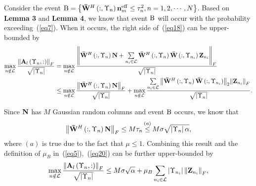 \documentclass[a4paper,12pt]{article}
\begin{document}
{\begin{framed}
{Consider the event ${{\rm{B}} = \left\{ {{{{\bf{\bar W}}}^H}\left( {:,{\Upsilon _n}} \right){\bf{n}}_m^{{\rm{eff}}} \le \tau _n^2,n = 1,2, \cdots ,N} \right\}}$. Based on \textbf{Lemma 3} and \textbf{Lemma 4}, we know that event ${{\rm{B}}}$ will occur with the probability exceeding~(\ref{eq7}). When it occurs, the right side of~(\ref{eq18}) can be upper-bounded by
\begin{align}\label{eq19}
\mathop {\max }\limits_{n \notin {\cal L}} \frac{{{{\left\| {{{\bf{A}}_l}\left( {{\Upsilon _n},:} \right)} \right\|}_F}}}{{\sqrt {\left| {{\Upsilon _n}} \right|} }} & = \mathop {\max }\limits_{n \notin {\cal L}} \frac{{{{\left\| {{{{\bf{\bar W}}}^H}\left( {:,{\Upsilon _n}} \right){\bf{N}} + \sum\limits_{{n_i} \in {\cal L}} {{{{\bf{\bar W}}}^H}\left( {:,{\Upsilon _n}} \right){\bf{\bar W}}\left( {:,{\Upsilon _{{n_i}}}} \right){{\bf{Z}}_{{n_i}}}} } \right\|}_F}}}{{\sqrt {\left| {{\Upsilon _n}} \right|} }}\\ \nonumber
& \le \mathop {\max }\limits_{n \notin {\cal L}} \frac{{{{\left\| {{{{\bf{\bar W}}}^H}\left( {:,{\Upsilon _n}} \right){\bf{N}}} \right\|}_F}}}{{\sqrt {\left| {{\Upsilon _n}} \right|} }} + \mathop {\max }\limits_{n \notin {\cal L}} \frac{{\sum\limits_{{n_i} \in {\cal L}} {{{\left\| {{{{\bf{\bar W}}}^H}\left( {:,{\Upsilon _n}} \right){\bf{\bar W}}\left( {:,{\Upsilon _{{n_i}}}} \right)} \right\|}_2}{{\left\| {{{\bf{Z}}_{{n_i}}}} \right\|}_F}} }}{{\sqrt {\left| {{\Upsilon _n}} \right|} }}.
\end{align}

Since ${{\bf{N}}}$ has ${M}$ Gaussian random columns and event ${{\rm{B}}}$ occurs, we know that
\begin{equation}\label{eq20}
{\left\| {{{{\bf{\bar W}}}^H}\left( {:,{\Upsilon _n}} \right){\bf{N}}} \right\|_F} \le M{\tau _n}\mathop  \le \limits^{\left( a \right)} M\sigma \sqrt {\left| {{\Upsilon _n}} \right|\alpha } ,
\end{equation}
where ${\left( a \right)}$ is true due to the fact that ${\mu  \le 1}$. Combining this result and the definition of ${{\mu _B}}$ in~(\ref{eq5}),~(\ref{eq20}) can be further upper-bounded by
\begin{equation}\label{eq21}
\mathop {\max }\limits_{n \notin {\cal L}} \frac{{{{\left\| {{{\bf{A}}_l}\left( {{\Upsilon _n},:} \right)} \right\|}_F}}}{{\sqrt {\left| {{\Upsilon _n}} \right|} }} \le M\sigma \sqrt \alpha   + {\mu _B}\sum\limits_{{n_i} \in {\cal L}} {\left| {{\Upsilon _{{n_i}}}} \right|{{\left\| {{{\bf{Z}}_{{n_i}}}} \right\|}_F}},
\end{equation}

}
\end{framed}}
\end{document}
